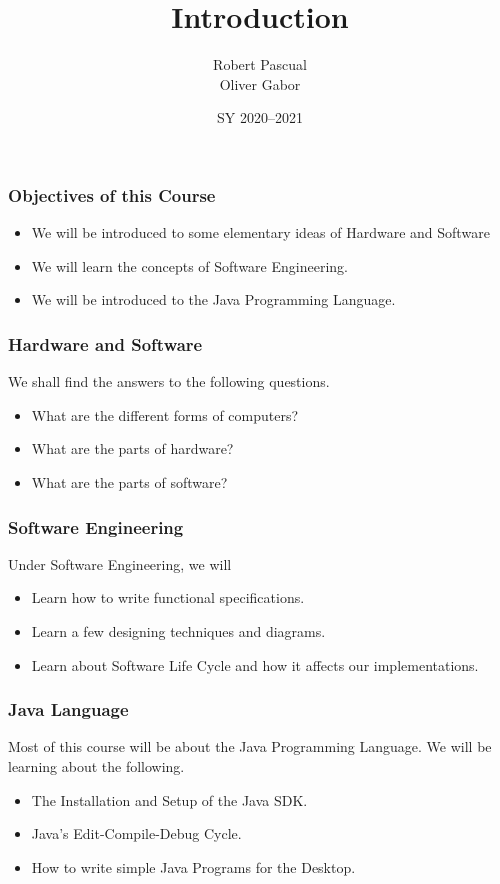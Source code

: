 \documentclass[12pt,aspectratio=169]{beamer}
\title{Introduction}
\institute{Makabulos Memorial High School}
\author{Robert Pascual\\
Oliver Gabor}
\date{SY 2020--2021}
\begin{document}
\maketitle

\begin{frame}
\frametitle{Objectives of this Course}\large

\begin{itemize}
\setlength\itemsep{0.2in}
\item We will be introduced to some elementary ideas of Hardware and Software
\item We will learn the concepts of Software Engineering.
\item We will be introduced to the Java Programming Language.
\end{itemize}
\end{frame}

\begin{frame}
\frametitle{Hardware and Software}\large

\noindent We shall find the answers to the following questions.

\begin{itemize}
\setlength\itemsep{0.2in}
\item What are the different forms of computers?
\item What are the parts of hardware?
\item What are the parts of software?
\end{itemize}
\end{frame}

\begin{frame}
\frametitle{Software Engineering}\large

\noindent Under Software Engineering, we will

\begin{itemize}
\setlength\itemsep{0.2in}
\item Learn how to write functional specifications.
\item Learn a few designing techniques and diagrams.
\item Learn about Software Life Cycle and how it affects
our implementations.
\end{itemize}
\end{frame}

\begin{frame}
\frametitle{Java Language}\large

Most of this course will be about the
Java Programming Language. We will
be learning about the following.


\begin{itemize}
\setlength\itemsep{0.2in}
\item The Installation and Setup of the Java SDK.
\item Java's Edit-Compile-Debug Cycle.
\item How to write simple Java Programs for the Desktop.
\end{itemize}
\end{frame}
\end{document}
